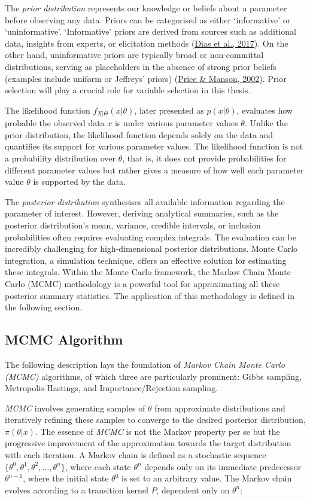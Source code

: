\documentclass[
  11pt,
]{article}
\begin{document}
The \emph{prior distribution} represents our knowledge or beliefs about
a parameter before observing any data. Priors can be categorised as
either `informative' or `uninformative'. `Informative' priors are
derived from sources such as additional data, insights from experts, or
elicitation methods (\protect\hyperlink{ref-Dias2017}{Dias et al.,
2017}). On the other hand, uninformative priors are typically broad or
non-committal distributions, serving as placeholders in the absence of
strong prior beliefs (examples include uniform or Jeffreys' priors)
(\protect\hyperlink{ref-Price2002}{Price \& Manson, 2002}). Prior
selection will play a crucial role for variable selection in this
thesis.

The likelihood function \(f_{X|\Theta}(x|\theta)\), later presented as
\(p(x|\theta)\), evaluates how probable the observed data \(x\) is under
various parameter values \(\theta\). Unlike the prior distribution, the
likelihood function depends solely on the data and quantifies its
support for various parameter values. The likelihood function is not a
probability distribution over \(\theta\), that is, it does not provide
probabilities for different parameter values but rather gives a measure
of how well each parameter value \(\theta\) is supported by the data.

The \emph{posterior distribution} synthesises all available information
regarding the parameter of interest. However, deriving analytical
summaries, such as the posterior distribution's mean, variance, credible
intervals, or inclusion probabilities often requires evaluating complex
integrals. The evaluation can be incredibly challenging for
high-dimensional posterior distributions. Monte Carlo integration, a
simulation technique, offers an effective solution for estimating these
integrals. Within the Monte Carlo framework, the Markov Chain Monte
Carlo (MCMC) methodology is a powerful tool for approximating all these
posterior summary statistics. The application of this methodology is
defined in the following section.

\subsection{MCMC Algorithm}

The following description lays the foundation of \emph{Markov Chain
Monte Carlo (MCMC)} algorithms, of which three are particularly
prominent: Gibbs sampling, Metropolis-Hastings, and Importance/Rejection
sampling.

\emph{MCMC} involves generating samples of \(\theta\) from approximate
distributions and iteratively refining these samples to converge to the
desired posterior distribution, \(\pi(\theta|x)\). The essence of
\emph{MCMC} is not the Markov property per se but the progressive
improvement of the approximation towards the target distribution with
each iteration. A Markov chain is defined as a stochastic sequence
\(\{\theta^0, \theta^1, \theta^2, \ldots, \theta^n\}\), where each state
\(\theta^n\) depends only on its immediate predecessor \(\theta^{n-1}\),
where the initial state \(\theta^0\) is set to an arbitrary value. The
Markov chain evolves according to a transition kernel \(P\), dependent
only on \(\theta^n\):
\end{document}
